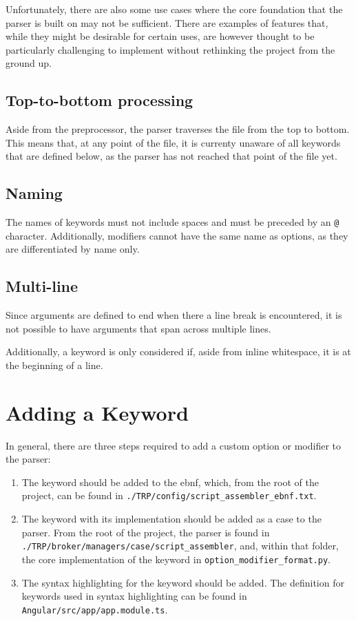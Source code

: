 Unfortunately, there are also some use cases where the core foundation that the parser is built on may not be sufficient. There are examples of features that, while they might be desirable for certain uses, are however thought to be particularly challenging to implement without rethinking the project from the ground up.

\subsection{Top-to-bottom processing}

Aside from the preprocessor, the parser traverses the file from the top to bottom. This means that, at any point of the file, it is currenty unaware of all keywords that are defined below, as the parser has not reached that point of the file yet.

\subsection{Naming}

The names of keywords must not include spaces and must be preceded by an \verb|@| character. Additionally, modifiers cannot have the same name as options, as they are differentiated by name only. 

\subsection{Multi-line}

Since arguments are defined to end when there a line break is encountered, it is not possible to have arguments that span across multiple lines.

Additionally, a keyword is only considered if, aside from inline whitespace, it is at the beginning of a line. 

\section{Adding a Keyword}

In general, there are three steps required to add a custom option or modifier to the parser:
\begin{enumerate}
    \item The keyword should be added to the \gls{ebnf}, which, from the root of the project, can be found in \verb|./TRP/config/script_assembler_ebnf.txt|.
    \item The keyword with its implementation should be added as a case to the parser. From the root of the project, the parser is found in \\\verb|./TRP/broker/managers/case/script_assembler|, and, within that folder, the core implementation of the keyword in \verb|option_modifier_format.py|. 
    \item The syntax highlighting for the keyword should be added. The definition for keywords used in syntax highlighting can be found in \\\verb|Angular/src/app/app.module.ts|. 
\end{enumerate}

